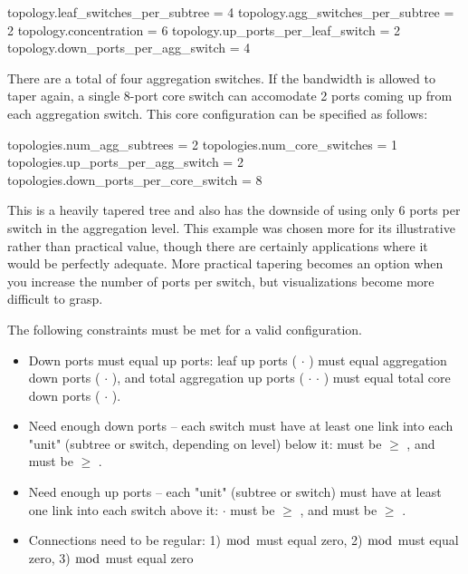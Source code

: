 \begin{ViFile}
topology.leaf_switches_per_subtree = 4
topology.agg_switches_per_subtree = 2
topology.concentration = 6
topology.up_ports_per_leaf_switch = 2
topology.down_ports_per_agg_switch = 4
\end{ViFile}

There are a total of four aggregation switches.
If the bandwidth is allowed to taper again, a single 8-port core switch can accomodate 2 ports coming up from each aggregation switch.
This core configuration can be specified as follows:

\begin{ViFile}
topologies.num_agg_subtrees = 2
topologies.num_core_switches = 1
topologies.up_ports_per_agg_switch = 2
topologies.down_ports_per_core_switch = 8
\end{ViFile}

This is a heavily tapered tree and also has the downside of using only 6 ports per switch in the aggregation level.
This example was chosen more for its illustrative rather than practical value, though there are certainly applications where it would be perfectly adequate. 
More practical tapering becomes an option when you increase the number of ports per switch, but visualizations become more difficult to grasp.

The following constraints must be met for a valid configuration.
\begin{itemize}
\renewcommand{\labelitemii}{$\circ$}
\item Down ports must equal up ports: leaf up ports ( $\cdot$ ) must equal aggregation down ports ( $\cdot$ ), and total aggregation up ports ( $\cdot$  $\cdot$ ) must equal total core down ports ( $\cdot$ ).
\item Need enough down ports -- each switch must have at least one link into each "unit" (subtree or switch, depending on level) below it:   must be $\geq$ , and  must be $\geq$ .
\item Need enough up ports -- each "unit" (subtree or switch) must have at least one link into each switch above it:  $\cdot$  must be $\geq$ , and  must be $\geq$ .
\item Connections need to be regular: 1)  $\bmod$  must equal zero, 2)  $\bmod$  must equal zero, 3)  $\bmod$  must equal zero
\end{itemize}

